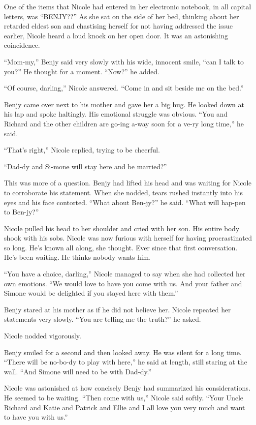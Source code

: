 \documentclass[]{article}
\begin{document}
{One of the items that Nicole had entered in her electronic notebook, in all capital letters, was “BENJY??” As she sat on the side of her bed, thinking about her retarded eldest son and chastising herself for not having addressed the issue earlier, Nicole heard a loud knock on her open door.  It was an astonishing coincidence.

“Mom-my,” Benjy said very slowly with his wide, innocent smile, “can I talk to you?” He thought for a moment.  “Now?” he added.

“Of course, darling,” Nicole answered.  “Come in and sit beside me on the bed.”

Benjy came over next to his mother and gave her a big hug.  He looked down at his lap and spoke haltingly.  His emotional struggle was obvious.  “You and Richard and the other children are go-ing a-way soon for a ve-ry long time,” he said.

“That’s right,” Nicole replied, trying to be cheerful.

“Dad-dy and Si-mone will stay here and be married?”

This was more of a question.  Benjy had lifted his head and was waiting for Nicole to corroborate his statement.  When she nodded, tears rushed instantly into his eyes and his face contorted.  “What about Ben-jy?” he said.  “What will hap-pen to Ben-jy?”

Nicole pulled his head to her shoulder and cried with her son.  His entire body shook with his sobs.  Nicole was now furious with herself for having procrastinated so long.  He’s known all along, she thought.  Ever since that first conversation.  He’s been waiting.  He thinks nobody wants him.

“You have a choice, darling,” Nicole managed to say when she had collected her own emotions.  “We would love to have you come with us.  And your father and Simone would be delighted if you stayed here with them.”

Benjy stared at his mother as if he did not believe her.  Nicole repeated her statements very slowly.  “You are telling me the truth?” he asked.

Nicole nodded vigorously.

Benjy smiled for a second and then looked away.  He was silent for a long time.  “There will be no-bo-dy to play with here,” he said at length, still staring at the wall.  “And Simone will need to be with Dad-dy.”

Nicole was astonished at how concisely Benjy had summarized his considerations.  He seemed to be waiting.  “Then come with us,” Nicole said softly.  “Your Uncle Richard and Katie and Patrick and Ellie and I all love you very much and want to have you with us.”

}
\end{document}
